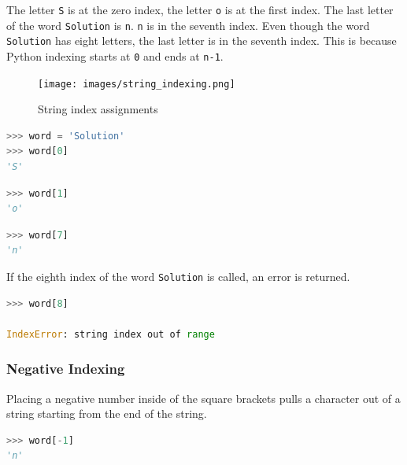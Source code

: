 \documentclass{book}
\begin{document}
The letter \lstinline!S! is at the zero index, the letter \lstinline!o!
is at the first index. The last letter of the word \lstinline!Solution!
is \lstinline!n!. \lstinline!n! is in the seventh index. Even though the
word \lstinline!Solution! has eight letters, the last letter is in the
seventh index. This is because Python indexing starts at \lstinline!0!
and ends at \lstinline!n-1!.

\begin{figure}
\centering
\texttt{[image: images/string\_indexing.png]}
\caption{String index assignments}
\end{figure}
    




    
        \begin{lstlisting}[language=Python]
>>> word = 'Solution'
>>> word[0]
'S'
\end{lstlisting}
    




    
        \begin{lstlisting}[language=Python]
>>> word[1]
'o'
\end{lstlisting}
    




    
        \begin{lstlisting}[language=Python]
>>> word[7]
'n'
\end{lstlisting}
    




    
        If the eighth index of the word \lstinline!Solution! is called, an error
is returned.

\begin{lstlisting}[language=Python]
>>> word[8]

IndexError: string index out of range
\end{lstlisting}
    




    
        \subsubsection{Negative Indexing}\label{negative-indexing}

Placing a negative number inside of the square brackets pulls a
character out of a string starting from the end of the string.

\begin{lstlisting}[language=Python]
>>> word[-1]
'n'
\end{lstlisting}
\end{document}
